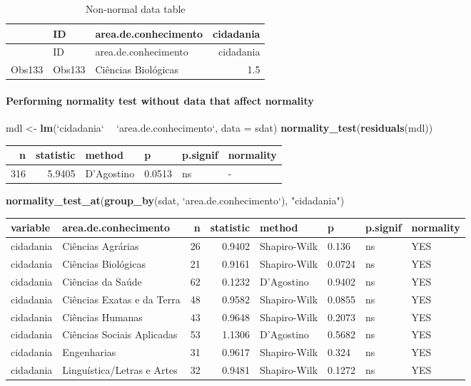 \documentclass[]{article}
\newenvironment{Shaded}{\begin{snugshade}}{\end{snugshade}}
\newcommand{\DataTypeTok}[1]{\textcolor[rgb]{0.13,0.29,0.53}{#1}}
\newcommand{\KeywordTok}[1]{\textcolor[rgb]{0.13,0.29,0.53}{\textbf{#1}}}
\newcommand{\NormalTok}[1]{#1}
\newcommand{\OperatorTok}[1]{\textcolor[rgb]{0.81,0.36,0.00}{\textbf{#1}}}
\newcommand{\StringTok}[1]{\textcolor[rgb]{0.31,0.60,0.02}{#1}}
\let\oldparagraph\paragraph
\renewcommand{\paragraph}[1]{\oldparagraph{#1}\mbox{}}
\begin{document}
\begin{longtable}[]{@{}lllr@{}}
\caption{Non-normal data table}\tabularnewline
\toprule
& ID & area.de.conhecimento & cidadania\tabularnewline
\midrule
\endfirsthead
\toprule
& ID & area.de.conhecimento & cidadania\tabularnewline
\midrule
\endhead
Obs133 & Obs133 & Ciências Biológicas & 1.5\tabularnewline
\bottomrule
\end{longtable}

\hypertarget{performing-normality-test-without-data-that-affect-normality}{%
\paragraph{Performing normality test without data that affect
normality}\label{performing-normality-test-without-data-that-affect-normality}}

\begin{Shaded}
\begin{Highlighting}[]
\NormalTok{mdl <-}\StringTok{ }\KeywordTok{lm}\NormalTok{(}\StringTok{`}\DataTypeTok{cidadania}\StringTok{`} \OperatorTok{~}\StringTok{ `}\DataTypeTok{area.de.conhecimento}\StringTok{`}\NormalTok{, }\DataTypeTok{data =}\NormalTok{ sdat)}
\KeywordTok{normality_test}\NormalTok{(}\KeywordTok{residuals}\NormalTok{(mdl))}
\end{Highlighting}
\end{Shaded}

\begin{longtable}[]{@{}rrllll@{}}
\toprule
n & statistic & method & p & p.signif & normality\tabularnewline
\midrule
\endhead
316 & 5.9405 & D'Agostino & 0.0513 & ns & -\tabularnewline
\bottomrule
\end{longtable}

\begin{Shaded}
\begin{Highlighting}[]
\KeywordTok{normality_test_at}\NormalTok{(}\KeywordTok{group_by}\NormalTok{(sdat, }\StringTok{`}\DataTypeTok{area.de.conhecimento}\StringTok{`}\NormalTok{), }\StringTok{"cidadania"}\NormalTok{)}
\end{Highlighting}
\end{Shaded}

\begin{longtable}[]{@{}llrrllll@{}}
\toprule
variable & area.de.conhecimento & n & statistic & method & p & p.signif
& normality\tabularnewline
\midrule
\endhead
cidadania & Ciências Agrárias & 26 & 0.9402 & Shapiro-Wilk & 0.136 & ns
& YES\tabularnewline
cidadania & Ciências Biológicas & 21 & 0.9161 & Shapiro-Wilk & 0.0724 &
ns & YES\tabularnewline
cidadania & Ciências da Saúde & 62 & 0.1232 & D'Agostino & 0.9402 & ns &
YES\tabularnewline
cidadania & Ciências Exatas e da Terra & 48 & 0.9582 & Shapiro-Wilk &
0.0855 & ns & YES\tabularnewline
cidadania & Ciências Humanas & 43 & 0.9648 & Shapiro-Wilk & 0.2073 & ns
& YES\tabularnewline
cidadania & Ciências Sociais Aplicadas & 53 & 1.1306 & D'Agostino &
0.5682 & ns & YES\tabularnewline
cidadania & Engenharias & 31 & 0.9617 & Shapiro-Wilk & 0.324 & ns &
YES\tabularnewline
cidadania & Linguística/Letras e Artes & 32 & 0.9481 & Shapiro-Wilk &
0.1272 & ns & YES\tabularnewline
\bottomrule
\end{longtable}
\end{document}
